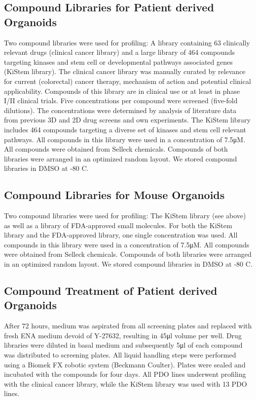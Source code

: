 \begin{flushleft}
\subsection{Compound Libraries for Patient derived Organoids}
Two compound libraries were used for profiling: A library containing 63 clinically relevant drugs (clinical cancer library) and a large library of 464 compounds targeting kinases and stem cell or developmental pathways associated genes (KiStem library). The clinical cancer library was manually curated by relevance for current (colorectal) cancer therapy, mechanism of action and potential clinical applicability. Compounds of this library are in clinical use or at least in phase I/II clinical trials. Five concentrations per compound were screened (five-fold dilutions). The concentrations were determined by analysis of literature data from previous 3D and 2D drug screens and own experiments. The KiStem library includes 464 compounds targeting a diverse set of kinases and stem cell relevant pathways. All compounds in this library were used in a concentration of 7.5μM. All compounds were obtained from Selleck chemicals. Compounds of both libraries were arranged in an optimized random layout. We stored compound libraries in DMSO at -80 C.

\subsection{Compound Libraries for Mouse Organoids}
Two compound libraries were used for profiling: The KiStem library (see above) as well as a library of FDA-approved small molecules. For both the KiStem library and the FDA-approved library, one single concentration was used. All compounds in this library were used in a concentration of 7.5μM. All compounds were obtained from Selleck chemicals. Compounds of both libraries were arranged in an optimized random layout. We stored compound libraries in DMSO at -80 C.

\subsection{Compound Treatment of Patient derived Organoids}
After 72 hours, medium was aspirated from all screening plates and replaced with fresh ENA medium devoid of Y-27632, resulting in 45μl volume per well. Drug libraries were diluted in basal medium and subsequently 5μl of each compound was distributed to screening plates. 
All liquid handling steps were performed using a Biomek FX robotic system (Beckmann Coulter). Plates were sealed and incubated with the compounds for four days. All PDO lines underwent profiling with the clinical cancer library, while the KiStem library was used with 13 PDO lines.


\end{flushleft}
